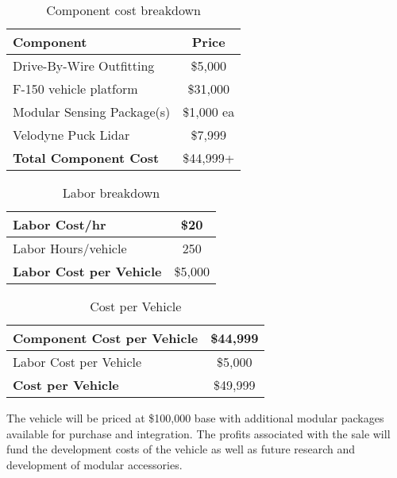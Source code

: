 \begin{table}[h!]
	\begin{center}
		\begin{tabular}{| l | c |}
			\hline
			\textbf{Component} & \textbf{Price} \\ \hline
			Drive-By-Wire Outfitting & \$5,000 \\ \hline
			F-150 vehicle platform & \$31,000 \\ \hline
			Modular Sensing Package(s) & \$1,000 ea \\ \hline
			Velodyne Puck Lidar & \$7,999 \\ \hline \hline
			\textbf{Total Component Cost} & \$44,999+ \\ \hline
		\end{tabular}
	\end{center}
	\caption{Component cost breakdown}
	\label{table:ComponentCosts}
\end{table}

\begin{table}[h!]
	\begin{center}
		\begin{tabular}{| l | c |}
			\hline
			Labor Cost/hr & \$20 \\ \hline
			Labor Hours/vehicle & 250 \\ \hline \hline
			\textbf{Labor Cost per Vehicle} & \$5,000 \\ \hline
		\end{tabular}
	\end{center}
	\caption{Labor breakdown}
	\label{table:LaborCost}
\end{table}

\begin{table}[h!]
	\begin{center}
		\begin{tabular}{| l | c |}
			\hline
			Component Cost per Vehicle & \$44,999 \\ \hline
			Labor Cost per Vehicle & \$5,000 \\ \hline \hline
			\textbf{Cost per Vehicle} & \$49,999 \\ \hline
		\end{tabular}
	\end{center}
	\caption{Cost per Vehicle}
	\label{table:VehicleCost}
\end{table}

The vehicle will be priced at \$100,000 base with additional modular packages available for purchase and integration. The profits associated with the sale will fund the development costs of the vehicle as well as future research and development of modular accessories.

